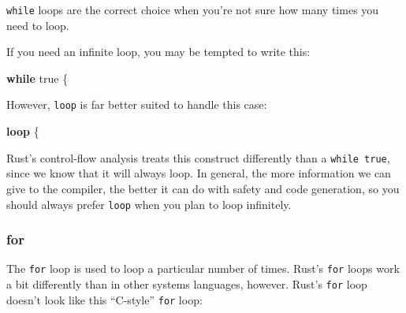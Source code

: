 \documentclass[a4paper,]{book}
\newenvironment{Shaded}{\begin{snugshade}}{\end{snugshade}}
\newcommand{\KeywordTok}[1]{\textcolor[rgb]{0.13,0.29,0.53}{\textbf{{#1}}}}
\newcommand{\DecValTok}[1]{\textcolor[rgb]{0.00,0.00,0.81}{{#1}}}
\newcommand{\ConstantTok}[1]{\textcolor[rgb]{0.00,0.00,0.00}{{#1}}}
\newcommand{\StringTok}[1]{\textcolor[rgb]{0.31,0.60,0.02}{{#1}}}
\newcommand{\CommentTok}[1]{\textcolor[rgb]{0.56,0.35,0.01}{\textit{{#1}}}}
\newcommand{\PreprocessorTok}[1]{\textcolor[rgb]{0.56,0.35,0.01}{\textit{{#1}}}}
\newcommand{\NormalTok}[1]{{#1}}
\begin{document}
\begin{Shaded}
\end{Shaded}

\texttt{while} loops are the correct choice when you're not sure how
many times you need to loop.

If you need an infinite loop, you may be tempted to write this:

\begin{Shaded}
\begin{Highlighting}[]
\KeywordTok{while} \ConstantTok{true} \NormalTok{\{}
\end{Highlighting}
\end{Shaded}

However, \texttt{loop} is far better suited to handle this case:

\begin{Shaded}
\begin{Highlighting}[]
\KeywordTok{loop} \NormalTok{\{}
\end{Highlighting}
\end{Shaded}

Rust's control-flow analysis treats this construct differently than a
\texttt{while\ true}, since we know that it will always loop. In
general, the more information we can give to the compiler, the better it
can do with safety and code generation, so you should always prefer
\texttt{loop} when you plan to loop infinitely.

\subsubsection{for}\label{for}

The \texttt{for} loop is used to loop a particular number of times.
Rust's \texttt{for} loops work a bit differently than in other systems
languages, however. Rust's \texttt{for} loop doesn't look like this
``C-style'' \texttt{for} loop:
\end{document}
